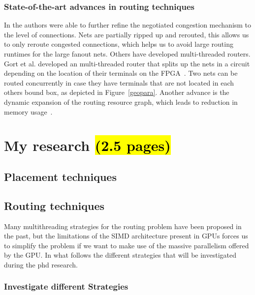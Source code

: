 \documentclass[a4paper,oneside,12pt]{article}
\begin{document}
\subsubsection{State-of-the-art advances in routing techniques}
In  \cite{vansteenkiste2013connection} the authors were able to further refine the negotiated congestion mechanism to the level of connections. Nets are partially ripped up and rerouted, this allows us to only reroute congested connections, which helps us to avoid large routing runtimes for the large fanout nets. Others have developed multi-threaded routers. Gort et al. developed an multi-threaded router that splits up the nets in a circuit depending on the location of their terminals on the FPGA~\cite{gort2010deterministic}. Two nets can be routed concurrently in case they have terminals that are not located in each others bound box, as depicted in Figure~\ref{geopara}.
Another advance is the dynamic expansion of the routing resource graph, which leads to reduction in memory usage~\cite{moctar2015fast}. 	
\cite{gort2013combined}


\section{My research \hl{(2.5 pages)}}

\subsection{Placement techniques}\label{placetech}


\subsection{Routing techniques}\label{routetech}

Many multithreading strategies for the routing problem have been proposed in the past, but the limitations of the SIMD architecture present in GPUs forces us to simplify the problem if we want to make use of the massive parallelism offered by the GPU.
In what follows the different strategies that will be investigated during the phd research.


\subsubsection{Investigate different Strategies}
\end{document}
